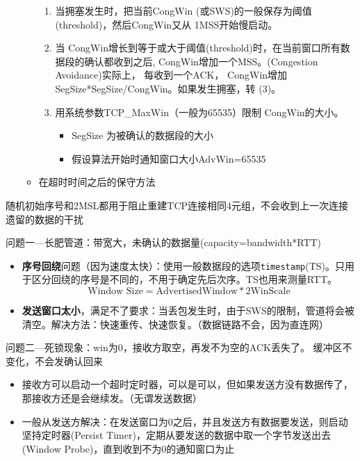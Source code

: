 \begin{itemize}
\begin{itemize}
\begin{enumerate}
            \item 当拥塞发生时，把当前CongWin (或SWS)的一般保存为阈值(threshold)，然后CongWin又从 1MSS开始慢启动。
            \item 当 CongWin增长到等于或大于阈值(threshold)时，在当前窗口所有数据段的确认都收到之后, CongWin增加一个MSS。(Congestion Avoidance)实际上， 每收到一个ACK， CongWin增加SegSize*SegSize/CongWin。如果发生拥塞，转 (3)。
            \item 用系统参数TCP\_MaxWin（一般为65535）限制 CongWin的大小。
            \begin{itemize}
                \item SegSize 为被确认的数据段的大小
                \item 假设算法开始时通知窗口大小AdvWin=65535
            \end{itemize}
        \end{enumerate}
        \item 在超时时间之后的保守方法
    \end{itemize}
\end{itemize}

随机初始序号和2MSL都用于阻止重建TCP连接相同4元组，不会收到上一次连接遗留的数据的干扰

问题一---长肥管道：带宽大，未确认的数据量(capacity=bandwidth*RTT)
\begin{itemize}
\item \textbf{序号回绕}问题（因为速度太快）：使用一般数据段的选项\verb'timestamp'(TS)。只用于区分回绕的序号是不同的，不用于确定先后次序。TS也用来测量RTT。
\[\text{Window Size} = \text{AdvertisedWindow} * 2\text{WinScale}\]
\item \textbf{发送窗口太小}，满足不了要求：当丢包发生时，由于SWS的限制，管道将会被清空。解决方法：快速重传、快速恢复。（数据链路不会，因为直连网）
\end{itemize}

问题二---死锁现象：win为0，接收方取空，再发不为空的ACK丢失了。
缓冲区不变化，不会发确认回来
\begin{itemize}
\item 接收方可以启动一个超时定时器，可以是可以，但如果发送方没有数据传了，那接收方还是会继续发。（无谓发送数据）
\item 一般从发送方解决：在发送窗口为0之后，并且发送方有数据要发送，则启动坚持定时器(Persist Timer)，定期从要发送的数据中取一个字节发送出去(Window Probe)，直到收到不为0的通知窗口为止
\end{itemize}

